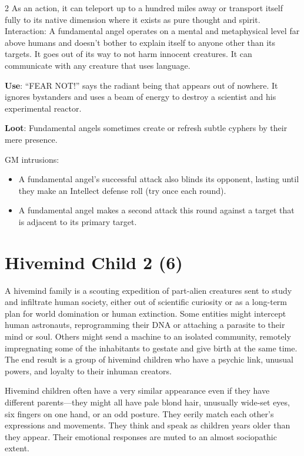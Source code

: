 \begin{multicols}{2}
As an action, it can teleport up to a hundred miles away or transport itself fully to its native dimension where it exists as pure thought and spirit.
Interaction: A fundamental angel operates on a mental and metaphysical level far above humans and doesn’t bother to explain itself to anyone other than its targets. It goes out of its way to not harm innocent creatures. It can communicate with any creature that uses language.

\textbf{Use}: “FEAR NOT!” says the radiant being that appears out of nowhere. It ignores bystanders and uses a beam of energy to destroy a scientist and his experimental reactor.

\textbf{Loot}: Fundamental angels sometimes create or refresh subtle cyphers by their mere presence.

GM intrusions:

\begin{itemize} 
\item A fundamental angel’s successful attack also blinds its opponent, lasting until they make an Intellect defense roll (try once each round).

\item A fundamental angel makes a second attack this round against a target that is adjacent to its primary target.
\end{itemize}

\section{Hivemind Child 2 (6)}

A hivemind family is a scouting expedition of part-alien creatures sent to study and infiltrate human society, either out of scientific curiosity or as a long-term plan for world domination or human extinction. Some entities might intercept human astronauts, reprogramming their DNA or attaching a parasite to their mind or soul. Others might send a machine to an isolated community, remotely impregnating some of the inhabitants to gestate and give birth at the same time. The end result is a group of hivemind children who have a psychic link, unusual powers, and loyalty to their inhuman creators.

Hivemind children often have a very similar appearance even if they have different parents—they might all have pale blond hair, unusually wide-set eyes, six fingers on one hand, or an odd posture. They eerily match each other’s expressions and movements. They think and speak as children years older than they appear. Their emotional responses are muted to an almost sociopathic extent.


\end{multicols}
